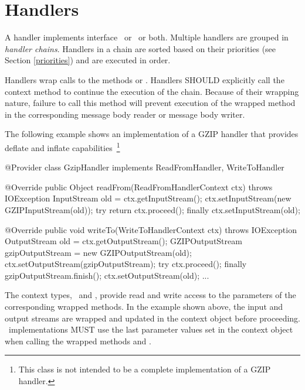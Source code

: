 \section{Handlers}

A handler implements interface \ReadFromHandler\ or \WriteToHandler\ or both. Multiple handlers are grouped in \emph{handler chains}. Handlers in a chain are sorted based on their priorities (see Section \ref{priorities}) and are executed in order. 

Handlers wrap calls to the methods  or . Handlers SHOULD explicitly call the context method   to continue the execution of the chain. Because of their wrapping nature, failure to call this method will prevent execution of the wrapped method in the corresponding message body reader or message body writer.

The following example shows an implementation of a GZIP handler that provides deflate and inflate capabilities~\footnote{This class is not intended to be a complete implementation of a GZIP handler.}

\begin{listing}{1}
@Provider
class GzipHandler implements ReadFromHandler, WriteToHandler {

    @Override
    public Object readFrom(ReadFromHandlerContext ctx) throws IOException {
        InputStream old = ctx.getInputStream();
        ctx.setInputStream(new GZIPInputStream(old));
        try {
            return ctx.proceed();
        } finally {
            ctx.setInputStream(old);
        }
    }

    @Override
    public void writeTo(WriteToHandlerContext ctx) throws IOException {
        OutputStream old = ctx.getOutputStream();
        GZIPOutputStream gzipOutputStream = new GZIPOutputStream(old);
        ctx.setOutputStream(gzipOutputStream);
        try {
            ctx.proceed();
        } finally {
            gzipOutputStream.finish();
            ctx.setOutputStream(old);
        }
    }
    ...
}
\end{listing}

The context types, \ReadFromHandlerContext\ and \WriteToHandlerContext, provide read and write access to the parameters of the corresponding wrapped methods. In the example shown above, the input and output streams are wrapped and updated in the context object before proceeding. \jaxrs\ implementations MUST use the last parameter values set in the context object when calling the wrapped methods  and .

